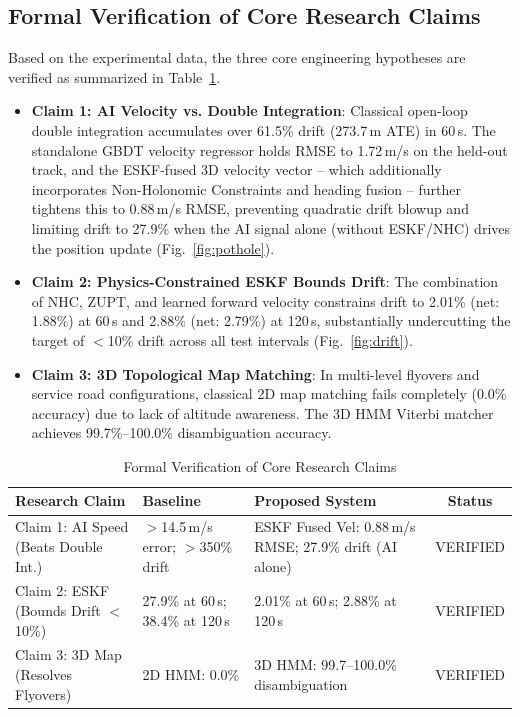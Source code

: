 \documentclass[conference]{IEEEtran}
\begin{document}
\subsection{Formal Verification of Core Research Claims}

Based on the experimental data, the three core engineering hypotheses are verified as summarized in Table~\ref{tab:claims}.
\begin{itemize}
\item \textbf{Claim 1: AI Velocity vs. Double Integration}: Classical open-loop double integration accumulates over 61.5\% drift (273.7\,m ATE) in 60\,s. The standalone GBDT velocity regressor holds RMSE to 1.72\,m/s on the held-out track, and the ESKF-fused 3D velocity vector -- which additionally incorporates Non-Holonomic Constraints and heading fusion -- further tightens this to 0.88\,m/s RMSE, preventing quadratic drift blowup and limiting drift to 27.9\% when the AI signal alone (without ESKF/NHC) drives the position update (Fig.~\ref{fig:pothole}).
\item \textbf{Claim 2: Physics-Constrained ESKF Bounds Drift}: The combination of NHC, ZUPT, and learned forward velocity constrains drift to 2.01\% (net: 1.88\%) at 60\,s and 2.88\% (net: 2.79\%) at 120\,s, substantially undercutting the target of $<$10\% drift across all test intervals (Fig.~\ref{fig:drift}).
\item \textbf{Claim 3: 3D Topological Map Matching}: In multi-level flyovers and service road configurations, classical 2D map matching fails completely (0.0\% accuracy) due to lack of altitude awareness. The 3D HMM Viterbi matcher achieves 99.7\%--100.0\% disambiguation accuracy.
\end{itemize}

\begin{table}[h]
\caption{Formal Verification of Core Research Claims}
\label{tab:claims}
\centering
\small
\begin{tabular}{p{1.8cm}p{1.9cm}p{2.3cm}c}
\toprule
\textbf{Research Claim} & \textbf{Baseline} & \textbf{Proposed System} & \textbf{Status} \\
\midrule
Claim 1: AI Speed (Beats Double Int.) & $>$14.5\,m/s error; $>$350\% drift & ESKF Fused Vel: 0.88\,m/s RMSE; 27.9\% drift (AI alone) & VERIFIED \\
\midrule
Claim 2: ESKF (Bounds Drift $<$10\%) & 27.9\% at 60\,s; 38.4\% at 120\,s & 2.01\% at 60\,s; 2.88\% at 120\,s & VERIFIED \\
\midrule
Claim 3: 3D Map (Resolves Flyovers) & 2D HMM: 0.0\% & 3D HMM: 99.7--100.0\% disambiguation & VERIFIED \\
\bottomrule
\end{tabular}
\end{table}
\end{document}
